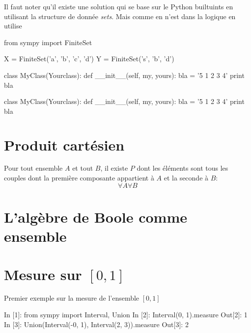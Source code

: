 \begin{solution}
Il faut noter qu'il existe une solution qui se base sur le Python builtuints en utilisant la structure de donnée \textit{sets}. Mais comme en n'est dans la logique en utilise 
\begin{python}
from sympy import FiniteSet

X = FiniteSet('a', 'b', 'c', 'd')
Y = FiniteSet('s', 'b', 'd')

class MyClass(Yourclass):
    def __init__(self, my, yours):
        bla = '5 1 2 3 4'
        print bla
\end{python}
\begin{python}
class MyClass(Yourclass):
    def __init__(self, my, yours):
        bla = '5 1 2 3 4'
        print bla
\end{python}

\end{solution}
\section{Produit cartésien}
 \begin{definition}
 Pour tout ensemble $A$ et tout $B$, il existe $P$ dont les éléments sont tous les couples dont la première composante appartient à $A$ et la seconde à $B$:
 \[
 \forall A \forall B
 \]
 
 \end{definition}
\section{L'algèbre de Boole comme ensemble}
 
 \begin{exercise}
 
 \end{exercise}
\section{Mesure sur $\left[0,1\right] $ }
Premier exemple sur la mesure de l'ensemble  $\left[0,1\right]$
\begin{python}
In [1]: from sympy import Interval, Union
In [2]: Interval(0, 1).measure
Out[2]: 1
In [3]: Union(Interval(-0, 1), Interval(2, 3)).measure                          
Out[3]: 2
\end{python}